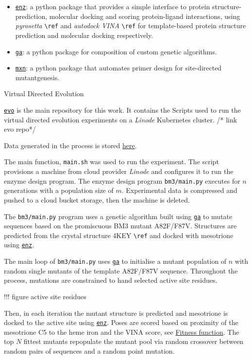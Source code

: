 \begin{itemize}
\tightlist
\item
  \protect\hyperlink{enz}{\texttt{enz}}: a python package that provides
  a simple interface to protein structure-prediction, molecular docking
  and scoring protein-ligand interactions, using \emph{pyrosetta}
  \texttt{\textbackslash{}ref} and \emph{autodock VINA}
  \texttt{\textbackslash{}ref} for template-based protein structure
  prediction and molecular docking respectively.
\item
  \protect\hyperlink{ga}{\texttt{ga}}: a python package for composition
  of custom genetic algorithms.
\item
  \protect\hyperlink{mxn}{\texttt{mxn}}: a python package that automates
  primer design for site-directed mutantgenesis.
\end{itemize}

Virtual Directed Evolution

\protect\hyperlink{evo}{\texttt{evo}} is the main repository for this
work. It contains the Scripts used to run the virtual directed evolution
experiments on a \emph{Linode} Kubernetes cluster. /* link evo repo*/

Data generated in the process is stored
\href{link\%20to\%20bucket}{here}.

The main function, \texttt{main.sh} was used to run the experiment. The
script provisions a machine from cloud provider \emph{Linode} and
configures it to run the enzyme design program. The enzyme design
program \texttt{bm3/main.py} executes for \(n\) generations with a
population size of \(m\). Experimental data is compressed and pushed to
a cloud bucket storage, then the machine is deleted.

The \texttt{bm3/main.py} program uses a genetic algorithm built using
\href{ga}{\texttt{ga}} to mutate sequences based on the promiscuous BM3
mutant A82F/F87V. Structures are predicted from the crystal structure
4KEY \texttt{\textbackslash{}ref} and docked with mesotrione using
\protect\hyperlink{enz}{\texttt{enz}}.

The main loop of \texttt{bm3/main.py} uses \href{ga}{\texttt{ga}} to
initialise a mutant population of \(n\) with random single mutants of
the template A82F/F87V sequence. Throughout the process, mutations are
constrained to hand selected active site residues.

!!! figure active site residues

Then, in each iteration the mutant structure is predicted and mesotrione
is docked to the active site using
\protect\hyperlink{enz}{\texttt{enz}}. Poses are scored based on
proximity of the mesotrione C5 to the heme iron and the VINA score, see
\href{sfxn}{Fitness function}. The top \(N%
\) fittest mutants repopulate the mutant pool via random crossover
between random pairs of sequences and a random point mutation.


